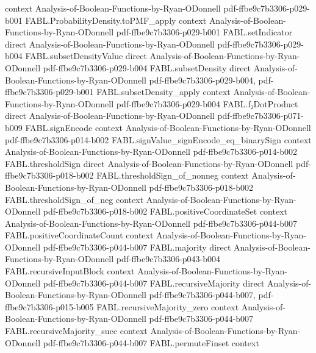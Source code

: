 \begin{theorem}
  {context}
  {Analysis-of-Boolean-Functions-by-Ryan-ODonnell}
  {pdf-ffbe9c7b3306-p029-b001}
\proofstep
  {FABL.ProbabilityDensity.toPMF_apply}
  {context}
  {Analysis-of-Boolean-Functions-by-Ryan-ODonnell}
  {pdf-ffbe9c7b3306-p029-b001}
\proofstep
  {FABL.setIndicator}
  {direct}
  {Analysis-of-Boolean-Functions-by-Ryan-ODonnell}
  {pdf-ffbe9c7b3306-p029-b004}
\proofstep
  {FABL.subsetDensityValue}
  {direct}
  {Analysis-of-Boolean-Functions-by-Ryan-ODonnell}
  {pdf-ffbe9c7b3306-p029-b004}
\proofstep
  {FABL.subsetDensity}
  {direct}
  {Analysis-of-Boolean-Functions-by-Ryan-ODonnell}
  {pdf-ffbe9c7b3306-p029-b004,
    pdf-ffbe9c7b3306-p029-b001}
\proofstep
  {FABL.subsetDensity_apply}
  {context}
  {Analysis-of-Boolean-Functions-by-Ryan-ODonnell}
  {pdf-ffbe9c7b3306-p029-b004}
\proofstep
  {FABL.f₂DotProduct}
  {direct}
  {Analysis-of-Boolean-Functions-by-Ryan-ODonnell}
  {pdf-ffbe9c7b3306-p071-b009}
\proofstep
  {FABL.signEncode}
  {context}
  {Analysis-of-Boolean-Functions-by-Ryan-ODonnell}
  {pdf-ffbe9c7b3306-p014-b002}
\proofstep
  {FABL.signValue_signEncode_eq_binarySign}
  {context}
  {Analysis-of-Boolean-Functions-by-Ryan-ODonnell}
  {pdf-ffbe9c7b3306-p014-b002}
\proofstep
  {FABL.thresholdSign}
  {direct}
  {Analysis-of-Boolean-Functions-by-Ryan-ODonnell}
  {pdf-ffbe9c7b3306-p018-b002}
\proofstep
  {FABL.thresholdSign_of_nonneg}
  {context}
  {Analysis-of-Boolean-Functions-by-Ryan-ODonnell}
  {pdf-ffbe9c7b3306-p018-b002}
\proofstep
  {FABL.thresholdSign_of_neg}
  {context}
  {Analysis-of-Boolean-Functions-by-Ryan-ODonnell}
  {pdf-ffbe9c7b3306-p018-b002}
\proofstep
  {FABL.positiveCoordinateSet}
  {context}
  {Analysis-of-Boolean-Functions-by-Ryan-ODonnell}
  {pdf-ffbe9c7b3306-p044-b007}
\proofstep
  {FABL.positiveCoordinateCount}
  {context}
  {Analysis-of-Boolean-Functions-by-Ryan-ODonnell}
  {pdf-ffbe9c7b3306-p044-b007}
\proofstep
  {FABL.majority}
  {direct}
  {Analysis-of-Boolean-Functions-by-Ryan-ODonnell}
  {pdf-ffbe9c7b3306-p043-b004}
\proofstep
  {FABL.recursiveInputBlock}
  {context}
  {Analysis-of-Boolean-Functions-by-Ryan-ODonnell}
  {pdf-ffbe9c7b3306-p044-b007}
\proofstep
  {FABL.recursiveMajority}
  {direct}
  {Analysis-of-Boolean-Functions-by-Ryan-ODonnell}
  {pdf-ffbe9c7b3306-p044-b007,
    pdf-ffbe9c7b3306-p015-b005}
\proofstep
  {FABL.recursiveMajority_zero}
  {context}
  {Analysis-of-Boolean-Functions-by-Ryan-ODonnell}
  {pdf-ffbe9c7b3306-p044-b007}
\proofstep
  {FABL.recursiveMajority_succ}
  {context}
  {Analysis-of-Boolean-Functions-by-Ryan-ODonnell}
  {pdf-ffbe9c7b3306-p044-b007}
\proofstep
  {FABL.permuteFinset}
  {context}

\end{theorem}
